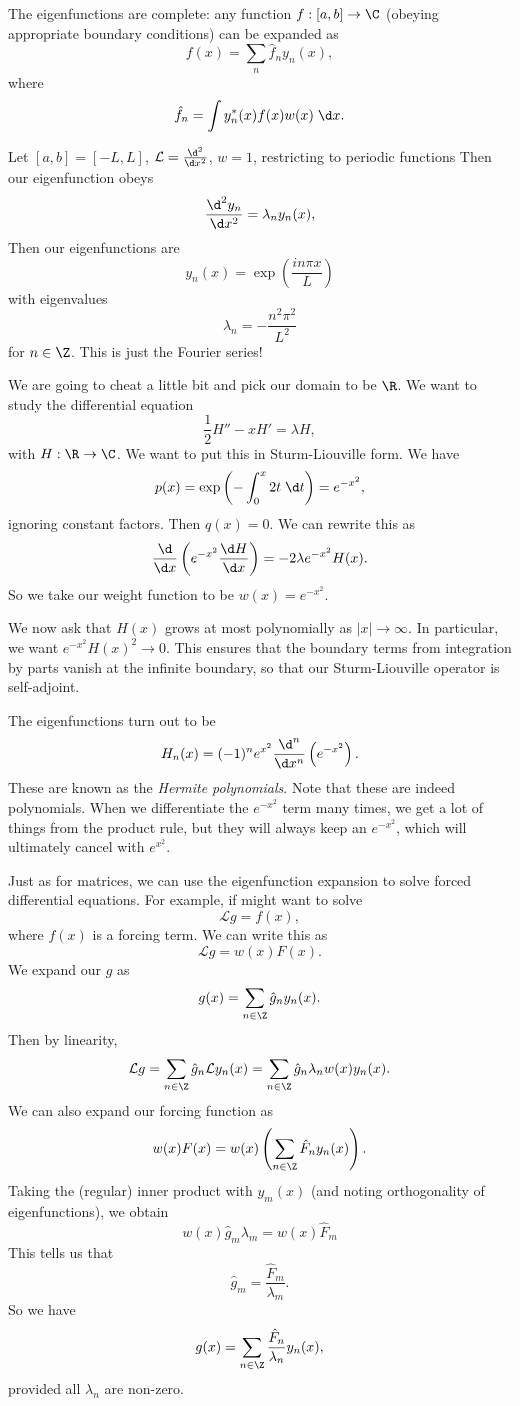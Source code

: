 \documentclass[a4paper]{article}
\begin{document}
\begin{thm}
  The eigenfunctions are complete: any function $f: [a, b] \to \C$ (obeying appropriate boundary conditions) can be expanded as
  \[
    f(x) = \sum_n \hat{f}_n y_n(x),
  \]
  where
  \[
    \hat{f}_n = \int y^*_n(x) f(x) w(x)\;\d x.
  \]
\end{thm}

\begin{eg}
  Let $[a, b] = [-L, L]$, $\mathcal{L} = \frac{\d^2}{\d x^2}$, $w = 1$, restricting to periodic functions Then our eigenfunction obeys
  \[
    \frac{\d^2 y_n}{\d x^2} = \lambda_n y_n(x),
  \]
  Then our eigenfunctions are
  \[
    y_n(x) = \exp\left(\frac{in\pi x}{L}\right)
  \]
  with eigenvalues
  \[
    \lambda_n = - \frac{n^2 \pi^2}{L^2}
  \]
  for $n \in \Z$. This is just the Fourier series!
\end{eg}

\begin{eg}
  We are going to cheat a little bit and pick our domain to be $\R$. We want to study the differential equation
  \[
    \frac{1}{2}H'' - xH' = \lambda H,
  \]
  with $H: \R \to \C$. We want to put this in Sturm-Liouville form. We have
  \[
    p(x) = \exp\left(-\int_0^x 2t \;\d t\right) = e^{-x^2},
  \]
  ignoring constant factors. Then $q(x) = 0$. We can rewrite this as
  \[
    \frac{\d}{\d x}\left(e^{-x^2}\frac{\d H}{\d x}\right) = -2\lambda e^{-x^2} H(x).
  \]
  So we take our weight function to be $w(x) = e^{-x^2}$.

  We now ask that $H(x)$ grows at most polynomially as $|x| \to \infty$. In particular, we want $e^{-x^2}H(x)^2 \to 0$. This ensures that the boundary terms from integration by parts vanish at the infinite boundary, so that our Sturm-Liouville operator is self-adjoint.

  The eigenfunctions turn out to be
  \[
    H_n(x) = (-1)^n e^{x^2}\frac{\d^n}{\d x^n}\left(e^{-x^2}\right).
  \]
  These are known as the \emph{Hermite polynomials}. Note that these are indeed polynomials. When we differentiate the $e^{-x^2}$ term many times, we get a lot of things from the product rule, but they will always keep an $e^{-x^2}$, which will ultimately cancel with $e^{x^2}$.
\end{eg}

Just as for matrices, we can use the eigenfunction expansion to solve forced differential equations. For example, if might want to solve
\[
  \mathcal{L} g = f(x),
\]
where $f(x)$ is a forcing term. We can write this as
\[
  \mathcal{L} g = w(x) F(x).
\]
We expand our $g$ as
\[
  g(x) = \sum_{n \in \Z}\hat{g}_n y_n(x).
\]
Then by linearity,
\[
  \mathcal{L}g = \sum_{n \in \Z}\hat{g}_n \mathcal{L} y_n(x) = \sum_{n \in \Z}\hat{g}_n \lambda_n w(x)y_n(x).
\]
We can also expand our forcing function as
\[
  w(x) F(x) = w(x) \left(\sum_{n \in \Z}\hat{F}_n y_n(x)\right).
\]
Taking the (regular) inner product with $y_m(x)$ (and noting orthogonality of eigenfunctions), we obtain
\[
  w(x) \hat{g}_m \lambda_m = w(x) \hat{F}_m
\]
This tells us that
\[
  \hat{g}_m = \frac{\hat{F}_m}{\lambda_m}.
\]
So we have
\[
  g(x) = \sum_{n \in \Z}\frac{\hat{F}_n}{\lambda_n}y_n(x),
\]
provided all $\lambda_n$ are non-zero.
\end{document}
